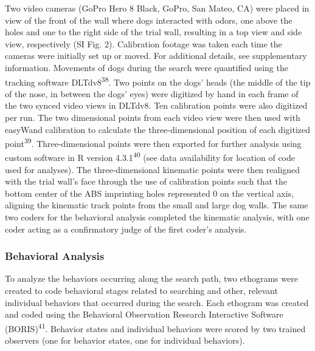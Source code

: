 \documentclass[
]{article}
\begin{document}
Two video cameras (GoPro Hero 8 Black, GoPro, San Mateo, CA) were placed in view of the front of the wall where dogs interacted with odors, one above the holes and one to the right side of the trial wall, resulting in a top view and side view, respectively (SI Fig. 2). Calibration footage was taken each time the cameras were initially set up or moved. For additional details, see supplementary information. Movements of dogs during the search were quantified using the tracking software DLTdv8\textsuperscript{38}. Two points on the dogs' heads (the middle of the tip of the nose, in between the dogs' eyes) were digitized by hand in each frame of the two synced video views in DLTdv8. Ten calibration points were also digitized per run. The two dimensional points from each video view were then used with easyWand calibration to calculate the three-dimensional position of each digitized point\textsuperscript{39}. Three-dimensional points were then exported for further analysis using custom software in R version 4.3.1\textsuperscript{40} (see data availability for location of code used for analyses). The three-dimensional kinematic points were then realigned with the trial wall's face through the use of calibration points such that the bottom center of the ABS imprinting holes represented 0 on the vertical axis, aligning the kinematic track points from the small and large dog walls. The same two coders for the behavioral analysis completed the kinematic analysis, with one coder acting as a confirmatory judge of the first coder's analysis.

\hypertarget{behavioral-analysis}{%
\subsubsection{Behavioral Analysis}\label{behavioral-analysis}}

To analyze the behaviors occurring along the search path, two ethograms were created to code behavioral stages related to searching and other, relevant individual behaviors that occurred during the search. Each ethogram was created and coded using the Behavioral Observation Research Interactive Software (BORIS)\textsuperscript{41}. Behavior states and individual behaviors were scored by two trained observers (one for behavior states, one for individual behaviors).
\end{document}

